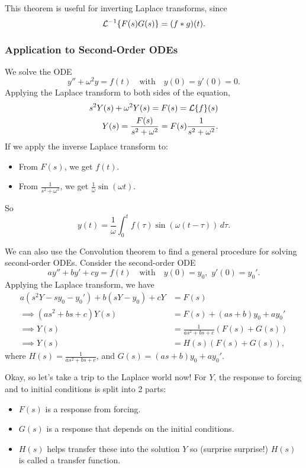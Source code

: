 This theorem is useful for inverting Laplace transforms, since
\[
\mathcal{L}^{-1}\{F(s)G(s)\} = (f*g)(t).
\]

\subsubsection{Application to Second-Order ODEs}

\begin{eg}
	We solve the ODE
	\[
	y'' + \omega^2y = f(t) \quad\text{with}\quad y(0) = y'(0) = 0.
	\]
	Applying the Laplace transform to both sides of the equation,
	\begin{align*}
		s^2Y(s) + \omega^2Y(s) = F(s) = \mathcal{L}\{f\}(s) \\
		Y(s) = \frac{F(s)}{s^2+\omega^2} = F(s) \frac{1}{s^2 + \omega^2}.
	\end{align*}
	If we apply the inverse Laplace transform to:
	\begin{itemize}
		\item From $F(s)$, we get $f(t)$. 
		\item From $\frac{1}{s^2+\omega^2}$, we get $\frac{1}{\omega} \sin(\omega t)$.
	\end{itemize}
	So
	\[
	y(t) = \frac{1}{\omega} \int_0^t f(\tau)\sin\left(\omega(t-\tau)\right) \,d\tau.
	\]
\end{eg}

We can also use the Convolution theorem to find a general procedure for solving second-order ODEs. Consider the second-order ODE
\[
	ay'' + by' + cy = f(t) \quad\text{with}\quad y(0) = y_0, \,\, y'(0) = y_0'.
\]
Applying the Laplace transform, we have
\begin{align*}
	a(s^2Y - sy_0 - y_0') + b(sY-y_0)+cY &= F(s) \\
	\implies (as^2+bs+c)Y(s) &= F(s) + (as+b)y_0 + ay_0' \\
	\implies Y(s) &= \frac{1}{as^2+bs+c} \left(F(s) + G(s)\right) \\
	\implies Y(s) &= H(s)\left(F(s)+G(s)\right),
\end{align*}
where $H(s) = \frac{1}{as^2+bs+c}$, and $G(s) = (as+b)y_0 + ay_0'$.

Okay, so let's take a trip to the Laplace world now! For $Y$, the response to forcing and to initial conditions is split into 2 parts:
\begin{itemize}
	\item $F(s)$ is a response from forcing.
	\item $G(s)$ is a response that depends on the initial conditions. 
	\item $H(s)$ helps transfer these into the solution $Y$ so (surprise surprise!) $H(s)$ is called a transfer function.
\end{itemize}

